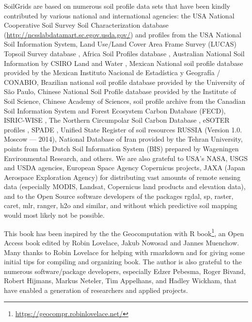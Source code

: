 \documentclass[11pt]{krantz}
\renewcommand{\href}[2]{#2\footnote{\url{#1}}}
\theoremstyle{definition}
\theoremstyle{definition}
\theoremstyle{definition}
\theoremstyle{remark}
\begin{document}
SoilGrids are based on numerous soil profile data sets that have been
kindly contributed by various national and international agencies: the
USA National Cooperative Soil Survey Soil Characterization database
(\url{http://ncsslabdatamart.sc.egov.usda.gov/}) and profiles from the
USA National Soil Information System, Land Use/Land Cover Area Frame
Survey (LUCAS) Topsoil Survey database \citep{Toth2013LUCAS}, Africa
Soil Profiles database \citep{Leenaars2012}, Australian National Soil
Information by CSIRO Land and Water
\citep{Karssies2011CSIRO, searle2014australian}, Mexican National soil
profile database \citep{INEGI2000} provided by the Mexican Instituto
Nacional de Estadística y Geografía / CONABIO, Brazilian national soil
profile database \citep{cooper2005national} provided by the University
of São Paulo, Chinese National Soil Profile database
\citep{shangguan2013china} provided by the Institute of Soil Science,
Chinese Academy of Sciences, soil profile archive from the Canadian Soil
Information System \citep{macdonald1992cansis} and Forest Ecosystem
Carbon Database (FECD), ISRIC-WISE \citep{Batjes2009SUM}, The Northern
Circumpolar Soil Carbon Database \citep{essd-5-3-2013}, eSOTER profiles
\citep{VanEngelen2012}, SPADE \citep{hollis2006spade}, Unified State
Register of soil resources RUSSIA (Version 1.0. Moscow --- 2014),
National Database of Iran provided by the Tehran University, points from
the Dutch Soil Information System (BIS) prepared by Wageningen
Environmental Research, and others. We are also grateful to USA's NASA,
USGS and USDA agencies, European Space Agency Copernicus projects, JAXA
(Japan Aerospace Exploration Agency) for distributing vast amounts of
remote sensing data (especially MODIS, Landsat, Copernicus land products
and elevation data), and to the Open Source software developers of the
packages rgdal, sp, raster, caret, mlr, ranger, h2o and similar, and
without which predictive soil mapping would most likely not be possible.

This book has been inspired by the
\href{https://geocompr.robinlovelace.net/}{the Geocomputation with R
book}, an Open Access book edited by Robin Lovelace, Jakub Nowosad and
Jannes Muenchow. Many thanks to Robin Lovelace for helping with
rmarkdown and for giving some initial tips for compiling and organizing
book. The author is also grateful to the numerous software/package
developers, especially Edzer Pebesma, Roger Bivand, Robert Hijmans,
Markus Neteler, Tim Appelhans, and Hadley Wickham, that have enabled a
generation of researchers and applied projects.
\end{document}
